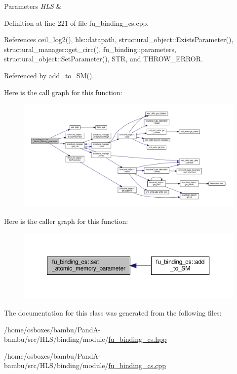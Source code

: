 \begin{DoxyParams}{Parameters}
{\em H\+LS} & \\
\hline
\end{DoxyParams}


Definition at line 221 of file fu\+\_\+binding\+\_\+cs.\+cpp.



References ceil\+\_\+log2(), hls\+::datapath, structural\+\_\+object\+::\+Exists\+Parameter(), structural\+\_\+manager\+::get\+\_\+circ(), fu\+\_\+binding\+::parameters, structural\+\_\+object\+::\+Set\+Parameter(), S\+TR, and T\+H\+R\+O\+W\+\_\+\+E\+R\+R\+OR.



Referenced by add\+\_\+to\+\_\+\+S\+M().

Here is the call graph for this function\+:
\nopagebreak
\begin{figure}[H]
\begin{center}
\leavevmode
\includegraphics[width=350pt]{d4/d7b/classfu__binding__cs_aa672ceff5ca96fa5fe84ae1582469b85_cgraph}
\end{center}
\end{figure}
Here is the caller graph for this function\+:
\nopagebreak
\begin{figure}[H]
\begin{center}
\leavevmode
\includegraphics[width=350pt]{d4/d7b/classfu__binding__cs_aa672ceff5ca96fa5fe84ae1582469b85_icgraph}
\end{center}
\end{figure}


The documentation for this class was generated from the following files\+:\begin{DoxyCompactItemize}
\item 
/home/osboxes/bambu/\+Pand\+A-\/bambu/src/\+H\+L\+S/binding/module/\hyperlink{fu__binding__cs_8hpp}{fu\+\_\+binding\+\_\+cs.\+hpp}\item 
/home/osboxes/bambu/\+Pand\+A-\/bambu/src/\+H\+L\+S/binding/module/\hyperlink{fu__binding__cs_8cpp}{fu\+\_\+binding\+\_\+cs.\+cpp}\end{DoxyCompactItemize}
